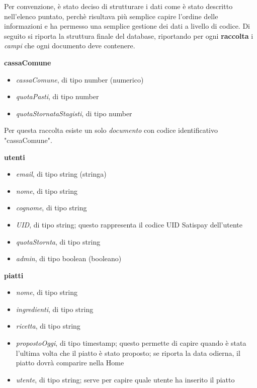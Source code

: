 \newline
Per convenzione, è stato deciso di strutturare i dati come è stato descritto nell'elenco puntato, perchè risultava più semplice capire l'ordine delle informazioni e ha permesso una semplice gestione dei dati a livello di codice.\newline
Di seguito si riporta la struttura finale del database, riportando per ogni \textbf{raccolta} i \emph{campi} che ogni documento deve contenere.\newline

\newpage

\textbf{cassaComune}
\begin{itemize}
    \item \emph{cassaComune}, di tipo number (numerico)
    \item \emph{quotaPasti}, di tipo number
    \item \emph{quotaStornataStagisti}, di tipo number
\end{itemize}
Per questa raccolta esiste un solo \emph{documento} con codice identificativo "cassaComune".\newline

\textbf{utenti}
\begin{itemize}
    \item \emph{email}, di tipo string (stringa)
    \item \emph{nome}, di tipo string
    \item \emph{cognome}, di tipo string
    \item \emph{UID}, di tipo string; questo rappresenta il codice UID Satispay dell'utente
    \item \emph{quotaStornta}, di tipo string
    \item \emph{admin}, di tipo boolean (booleano)
\end{itemize}

\textbf{piatti}
\begin{itemize}
    \item \emph{nome}, di tipo string
    \item \emph{ingredienti}, di tipo string
    \item \emph{ricetta}, di tipo string
    \item \emph{propostoOggi}, di tipo timestamp; questo permette di capire quando è stata l'ultima volta che il piatto è stato proposto; se riporta la data odierna, il piatto dovrà comparire nella Home
    \item \emph{utente}, di tipo string; serve per capire quale utente ha inserito il piatto
\end{itemize}

